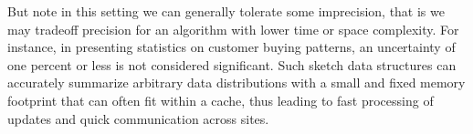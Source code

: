 But note in this setting we can generally tolerate some imprecision, that is we may tradeoff precision for an algorithm with lower time or space complexity. For instance, in presenting statistics on customer buying patterns, an uncertainty of one percent or less is not considered significant. Such sketch data structures can accurately summarize arbitrary data distributions with a small and fixed memory footprint that can often fit within a cache, thus leading to fast processing of updates and quick communication across sites.



